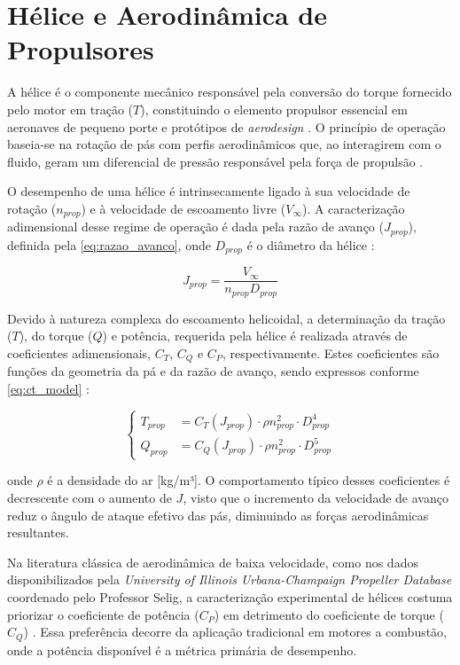 \section{Hélice e Aerodinâmica de Propulsores}
\label{sec:helice_aerodinamica}

A hélice é o componente mecânico responsável pela conversão do torque fornecido pelo motor em tração ($T$), constituindo o elemento propulsor essencial em aeronaves de pequeno porte e protótipos de \textit{aerodesign} \cite{McCormick1995}. O princípio de operação baseia-se na rotação de pás com perfis aerodinâmicos que, ao interagirem com o fluido, geram um diferencial de pressão responsável pela força de propulsão \cite{Brandt2015}.


O desempenho de uma hélice é intrinsecamente ligado à sua velocidade de rotação ($n_{prop}$) e à velocidade de escoamento livre ($V_{\infty}$). A caracterização adimensional desse regime de operação é dada pela razão de avanço ($J_{prop}$), definida pela \eqref{eq:razao_avanco}, onde $D_{prop}$ é o diâmetro da hélice \cite{Brandt2015}:

\begin{equation}
    J_{prop} = \frac{V_{\infty}}{n_{prop} D_{prop}}
    \label{eq:razao_avanco}
\end{equation}


Devido à natureza complexa do escoamento helicoidal, a determinação da tração ($T$), do torque ($Q$) e potência, requerida pela hélice é realizada através de coeficientes adimensionais, $C_T$, $C_Q$ e $C_P$, respectivamente. Estes coeficientes são funções da geometria da pá e da razão de avanço, sendo expressos conforme \eqref{eq:ct_model} \cite{McCormick1995, Brandt2015}:

\begin{equation}
    \begin{cases}
        T_{prop} &= C_T(J_{prop}) \cdot \rho n_{prop}^2 \cdot D_{prop}^4  \\
        Q_{prop} &= C_Q(J_{prop}) \cdot \rho n_{prop}^2 \cdot D_{prop}^5 
    \end{cases}
    \label{eq:ct_model}
\end{equation}

\noindent onde $\rho$ é a densidade do ar [kg/m³]. O comportamento típico desses coeficientes é decrescente com o aumento de $J$, visto que o incremento da velocidade de avanço reduz o ângulo de ataque efetivo das pás, diminuindo as forças aerodinâmicas resultantes.

Na literatura clássica de aerodinâmica de baixa velocidade, como nos dados disponibilizados pela \textit{University of Illinois Urbana-Champaign Propeller Database} coordenado pelo Professor Selig, a caracterização experimental de hélices costuma priorizar o coeficiente de potência ($C_P$) em detrimento do coeficiente de torque ($C_Q$) \cite{SeligPropDB}. Essa preferência decorre da aplicação tradicional em motores a combustão, onde a potência disponível é a métrica primária de desempenho.

